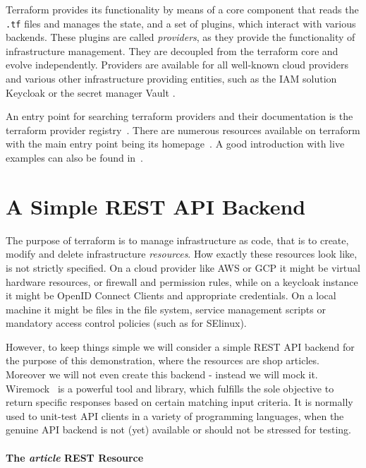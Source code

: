 \documentclass[paper=a4,11pt,numbers=noenddot]{article}
\begin{document}
Terraform provides its functionality by means of a core component that reads the \verb'.tf' files and manages the state, and a set of plugins, which interact with various backends. These plugins are called \emph{providers}, as they provide the functionality of infrastructure management. They are decoupled from the terraform core and evolve independently. Providers are available for all well-known cloud providers and various other infrastructure providing entities, such as the IAM solution Keycloak \autocite{team_keycloak_nodate} or the secret manager Vault \autocite{noauthor_vault_nodate}.

An entry point for searching terraform providers and their documentation is the terraform provider registry~\autocite{noauthor_terraform_registry_nodate}. There are numerous resources available on terraform with the main entry point being its homepage~\autocite{noauthor_terraform_nodate}. A good introduction with live examples can also be found in~\autocite{brikman_terraform_2022}.


\section{A Simple REST API Backend}
\label{sec:simple-rest-api}

The purpose of terraform is to manage infrastructure as code, that is to create, modify and delete infrastructure \emph{resources}. How exactly these resources look like, is not strictly specified. On a cloud provider like AWS or GCP it might be virtual hardware resources, or firewall and permission rules, while on a keycloak instance it might be OpenID Connect Clients and appropriate credentials. On a local machine it might be files in the file system, service management scripts or mandatory access control policies (such as for SElinux).

However, to keep things simple we will consider a simple REST API backend for the purpose of this demonstration, where the resources are shop articles. Moreover we will not even create this backend - instead we will mock it. Wiremock~\autocite{noauthor_wiremock_nodate} is a powerful tool and library, which fulfills the sole objective to return specific responses based on certain matching input criteria. It is normally used to unit-test API clients in a variety of programming languages, when the genuine API backend is not (yet) available or should not be stressed for testing.

\paragraph{The \emph{article} REST Resource}
\end{document}
